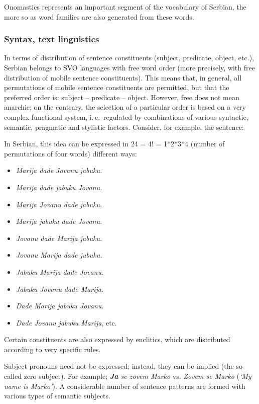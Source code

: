 \begin{multicols}{2}
Onomastics represents an important segment of the vocabulary of Serbian, the more so as word families are also generated from these words. 

\subsubsection {Syntax, text linguistics}

In terms of distribution of sentence constituents (subject, predicate, object, etc.), Serbian belongs to SVO languages with free word order (more precisely, with free distribution of mobile sentence constituents). This means that, in general, all permutations of mobile sentence constituents are permitted, but that the preferred order is: subject – predicate – object. However, free does not mean anarchic; on the contrary, the selection of a particular order is based on a very complex functional system, i.\,e.~regulated by combinations of various syntactic, semantic, pragmatic and stylistic factors.  Consider, for example, the sentence:
In Serbian, this idea can be expressed in 24 = 4! = 1*2*3*4 (number of permutations of four words) different ways:
\begin{itemize}
 \item \textit{Marija dade Jovanu jabuku.}
 \item \textit{Marija dade jabuku Jovanu.}
\item \textit{Marija Jovanu dade jabuku.} 
\item \textit{Marija jabuku dade Jovanu.}
\item \textit{Jovanu dade Marija jabuku.}
\item \textit{Jovanu Marija dade jubuku.}
\item \textit{Jabuku Marija dade Jovanu.}
\item \textit{Jabuku Jovanu dade Marija.}
\item \textit{Dade Marija jabuku Jovanu. }
\item \textit{Dade Jovanu jabuku Marija}, etc.
\end{itemize}
Certain constituents are also expressed by enclitics, which are distributed according to very specific rules. 

Subject pronouns need not be expressed; instead, they can be implied (the so-called zero subject). For example; \textit{\textbf{Ja} se zovem Marko} vs. \textit{Zovem se Marko} (\textit{‘My name is Marko’}). A considerable number of sentence patterns are formed with various types of semantic subjects. 


\end{multicols}
